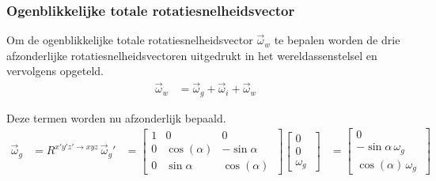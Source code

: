 \subsubsection{Ogenblikkelijke totale rotatiesnelheidsvector}
Om de ogenblikkelijke totale rotatiesnelheidsvector $\overrightarrow{\omega}_{w}$ te bepalen worden de drie afzonderlijke rotatiesnelheidsvectoren uitgedrukt in het wereldassenstelsel en vervolgens opgeteld.
\begin{equation*}
\begin{split}
\overrightarrow{\omega}_{w}
&=\overrightarrow{\omega}_{g}+\overrightarrow{\omega}_{i}+\overrightarrow{\omega}_{w}
\end{split}
\end{equation*}



Deze termen worden nu afzonderlijk bepaald.
\begin{equation*}
\begin{split}
\overrightarrow{\omega}_{g}
&=R^{x'y'z' \rightarrow xyz}\,\overrightarrow{\omega}_{g}'
&=	  \begin{bmatrix}
      1 & 0 & 0\\
      0 & \cos(\alpha) & -\sin{\alpha}\\ 
      0 & \sin{\alpha} & \cos(\alpha)\
      \end{bmatrix}
      \begin{bmatrix}
      0\\
      0\\
      \omega_{g}\
      \end{bmatrix}     
&=	  \begin{bmatrix}
      0\\
      -\sin{\alpha}\,\omega_{g}\\
      \cos(\alpha)\,\omega_{g}\
      \end{bmatrix}
\end{split}
\end{equation*}

